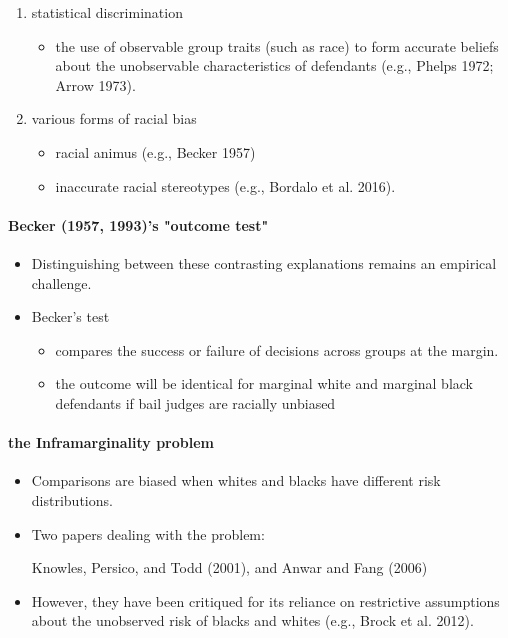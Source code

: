 \documentclass[../root]{subfiles}
\begin{document}
    \begin{enumerate}
      \item statistical discrimination
      \begin{itemize}
        \item the use of observable group traits (such as race) to form accurate beliefs about the unobservable characteristics of defendants (e.g., Phelps 1972; Arrow 1973).
      \end{itemize}
      \item various forms of racial bias
      \begin{itemize}
        \item racial animus (e.g., Becker 1957)
        \item inaccurate racial stereotypes (e.g., Bordalo et al. 2016).
      \end{itemize}
    \end{enumerate}

    \paragraph{Becker (1957, 1993)'s "outcome test"}

    \begin{itemize}
      \item Distinguishing between these contrasting explanations remains an empirical challenge.
      \item Becker's test
      \begin{itemize}
        \item compares the success or failure of decisions across groups at the margin.
        \item the outcome will be identical for marginal white and marginal black defendants if bail judges are racially unbiased
      \end{itemize}
    \end{itemize}

    \paragraph{the Inframarginality problem}

    \begin{itemize}
      \item Comparisons are biased when whites and blacks have different risk distributions.
      \item Two papers dealing with the problem:

      Knowles, Persico, and Todd (2001), and Anwar and Fang (2006)

      \item However, they have been critiqued for its reliance on restrictive assumptions about the unobserved risk of blacks and whites (e.g., Brock et al. 2012).
    \end{itemize}
\end{document}
